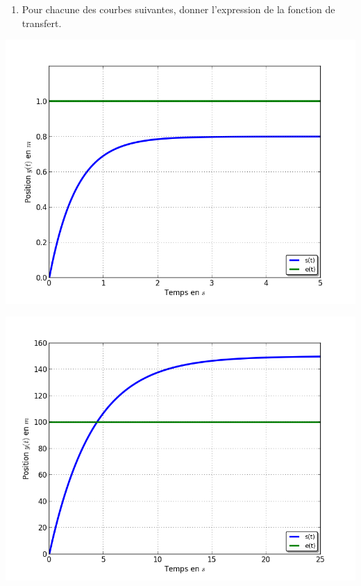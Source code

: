 
\begin{enumerate}
\item Pour chacune des courbes suivantes, donner l'expression de la fonction de transfert.
\end{enumerate}

\begin{minipage}[c]{.49\linewidth}
\begin{center}
\includegraphics[width=\textwidth]{png/courbe1-1O}
\end{center}
\end{minipage}\hfill
\begin{minipage}[c]{.49\linewidth}
\begin{center}
\includegraphics[width=\textwidth]{png/courbe2-1O}
\end{center}
\end{minipage}

